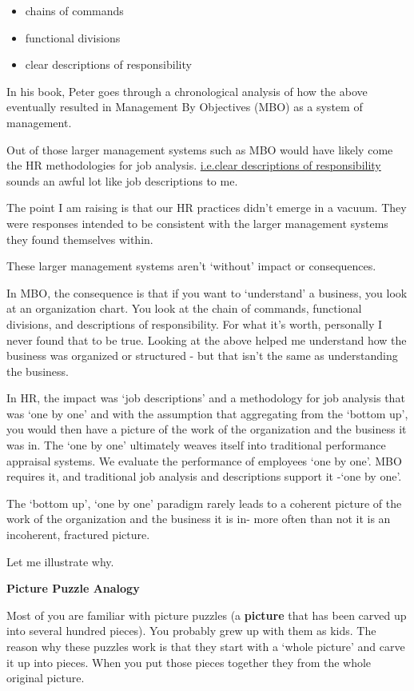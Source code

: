 \documentclass[12pt,letterpaper]{article}
\begin{document}
\begin{itemize}
\item
  chains of commands
\item
  functional divisions
\item
  clear descriptions of responsibility
\end{itemize}

In his book, Peter goes through a chronological analysis of how the
above eventually resulted in Management By Objectives (MBO) as a system
of management.

Out of those larger management systems such as MBO would have likely
come the HR methodologies for job analysis. 
\underline{i.e.clear descriptions  of responsibility} sounds an awful
lot like job descriptions to me.




The point I am raising is that our HR practices didn't emerge in a
vacuum. They were responses intended to be consistent with the larger
management systems they found themselves within.

These larger management systems aren't `without' impact or consequences.

In MBO, the consequence is that if you want to `understand' a business,
you look at an organization chart. You look at the chain of commands,
functional divisions, and descriptions of responsibility. For what it's
worth, personally I never found that to be true. Looking at the above
helped me understand how the business was organized or structured - but
that isn't the same as understanding the business.

In HR, the impact was `job descriptions' and a methodology for job
analysis that was `one by one' and with the assumption that aggregating
from the `bottom up', you would then have a picture of the work of the
organization and the business it was in. The `one by one' ultimately
weaves itself into traditional performance appraisal systems. We
evaluate the performance of employees `one by one'. MBO requires it, and
traditional job analysis and descriptions support it -`one by one'.

The `bottom up', `one by one' paradigm rarely leads to a coherent
picture of the work of the organization and the business it is in- more
often than not it is an incoherent, fractured picture.

Let me illustrate why.


\textbf{Picture Puzzle Analogy}

Most of you are familiar with picture puzzles (a \textbf{picture} that
has been carved up into several hundred pieces). You probably grew up
with them as kids. The reason why these puzzles work is that they start
with a `whole picture' and carve it up into pieces. When you put those
pieces together they from the whole original picture.
\end{document}
